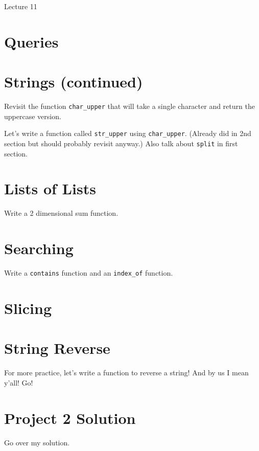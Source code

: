 \documentclass[12pt]{article}
\begin{document}
\begin{center}
   \LARGE Lecture 11
\end{center}

\section*{Queries}

\section{Strings (continued)}

Revisit the function \lstinline{char_upper} that will take a single character
and return the uppercase version.

Let's write a function called \lstinline{str_upper} using
\lstinline{char_upper}.  (Already did in 2nd section but should probably
revisit anyway.)  Also talk about \lstinline{split} in first section.

\section{Lists of Lists}

Write a 2 dimensional sum function.

\section{Searching}

Write a \lstinline{contains} function and an \lstinline{index_of} function.

\section*{Slicing}



\section{String Reverse}

For more practice, let's write a function to reverse a string!  And by us I
mean y'all!  Go!



\section*{Project 2 Solution}

Go over my solution.
\end{document}
